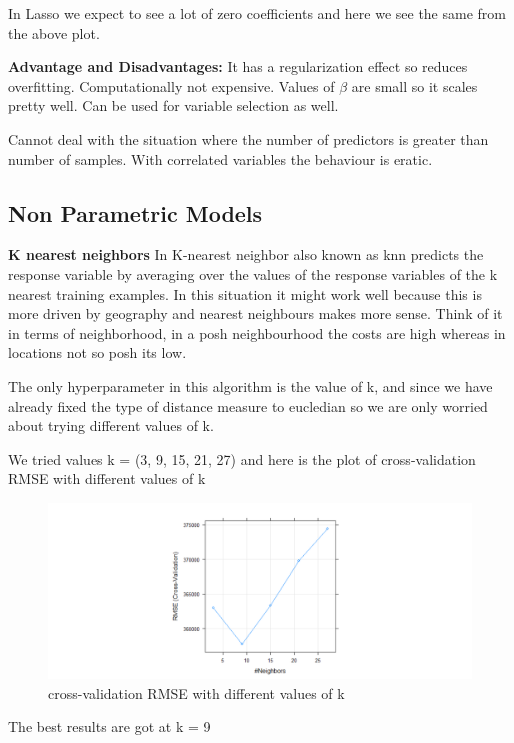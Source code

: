 \documentclass[]{article}
\begin{document}
In Lasso we expect to see a lot of zero coefficients and here we see the
same from the above plot.

\textbf{Advantage and Disadvantages:} It has a regularization effect so
reduces overfitting. Computationally not expensive. Values of \(\beta\)
are small so it scales pretty well. Can be used for variable selection
as well.

Cannot deal with the situation where the number of predictors is greater
than number of samples. With correlated variables the behaviour is
eratic.

\subsection{Non Parametric Models}\label{non-parametric-models}

\textbf{K nearest neighbors} In K-nearest neighbor also known as knn
predicts the response variable by averaging over the values of the
response variables of the k nearest training examples. In this situation
it might work well because this is more driven by geography and nearest
neighbours makes more sense. Think of it in terms of neighborhood, in a
posh neighbourhood the costs are high whereas in locations not so posh
its low.

The only hyperparameter in this algorithm is the value of k, and since
we have already fixed the type of distance measure to eucledian so we
are only worried about trying different values of k.

We tried values k = (3, 9, 15, 21, 27) and here is the plot of
cross-validation RMSE with different values of k

\begin{figure}
\centering
\includegraphics{Report_files/figure-latex/unnamed-chunk-20-1.pdf}
\caption{cross-validation RMSE with different values of k}
\end{figure}

The best results are got at k = 9
\end{document}

